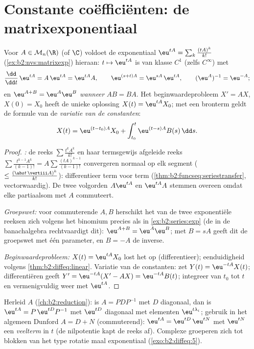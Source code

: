 \section{Constante coëfficiënten: de matrixexponentiaal}

\begin{theorem}\label{thm:b2:diffeq:matrixexp}
Voor $A \in \mathcal{M}_n(\R)$ (of $\C$) voldoet de exponentiaal
$\eu^{tA} = \sum_k \frac{(tA)^k}{k!}$
(\cref{ex:b2:nvs:matrixexp}) hieraan: $t \mapsto \eu^{tA}$ is van
klasse $C^1$ (zelfs $C^\infty$) met
\[
\frac{\dd}{\dd t}\,\eu^{tA} = A\,\eu^{tA} = \eu^{tA}A ,
\qquad
\eu^{(s+t)A} = \eu^{sA}\,\eu^{tA},
\qquad
(\eu^{A})^{-1} = \eu^{-A} ;
\]
en $\eu^{A + B} = \eu^A\eu^B$ \emph{wanneer} $AB = BA$. Het
beginwaardeprobleem $X' = AX$, $X(0) = X_0$ heeft de unieke
oplossing $X(t) = \eu^{tA}X_0$; met een bronterm geldt de formule
van de \emph{variatie van de constanten}:
\[
X(t) = \eu^{(t - t_0)A}X_0 + \int_{t_0}^{t} \eu^{(t-s)A}B(s)\,\dd
s .
\]
\end{theorem}

\begin{proof}
\emph{:} de reeks $\sum \frac{t^kA^k}{k!}$ en
haar termsgewijs afgeleide reeks $\sum \frac{t^{k-1}A^k}{(k-1)!} =
A\sum \frac{(tA)^{k-1}}{(k-1)!}$ convergeren normaal op elk segment
( $\leq \frac{(\abs t\,\vertiii A)^k}{k!}$): differentieer
term voor term (\cref{thm:b2:funcseq:seriestransfer}, vectorwaardig).
De twee volgorden $A\eu^{tA}$ en $\eu^{tA}A$ stemmen overeen omdat
elke partiaalsom met $A$ commuteert.

\emph{Groepswet:} voor commuterende $A, B$ herschikt het
 van de twee exponentiële reeksen zich volgens het
binomium precies als in \cref{ex:b2:series:exp} (de  in de banachalgebra rechtvaardigt dit): $\eu^{A+B} =
\eu^A\eu^B$; met $B = sA$ geeft dit de groepswet met één parameter,
en $B = -A$ de inverse.

\emph{Beginwaardeprobleem:} $X(t) = \eu^{tA}X_0$ lost het op
(differentieer); eenduidigheid volgens
\cref{thm:b2:diffeq:linear}. Variatie van de constanten: zet $Y(t)
= \eu^{-tA}X(t)$; differentiëren geeft $Y' = \eu^{-tA}(X' - AX) =
\eu^{-tA}B(t)$; integreer van $t_0$ tot $t$ en vermenigvuldig weer
met $\eu^{tA}$.
\end{proof}

\begin{method}[$\eu^{tA}$ berekenen]\label{met:b2:diffeq:computeexp}
Herleid $A$ (\cref{ch:b2:reduction}): is $A = PDP^{-1}$ met $D$
diagonaal, dan is $\eu^{tA} = P\,\eu^{tD}P^{-1}$ met $\eu^{tD}$
diagonaal met elementen $\eu^{t\lambda_i}$; gebruik in het algemeen
Dunford $A = D + N$ (commuterend): $\eu^{tA} = \eu^{tD}\,\eu^{tN}$
met $\eu^{tN}$ een \emph{veelterm} in $t$ (de nilpotentie kapt de
reeks af). Complexe  groeperen zich tot blokken van het
type rotatie maal exponentiaal (\cref{exo:b2:diffeq:5}).
\end{method}


